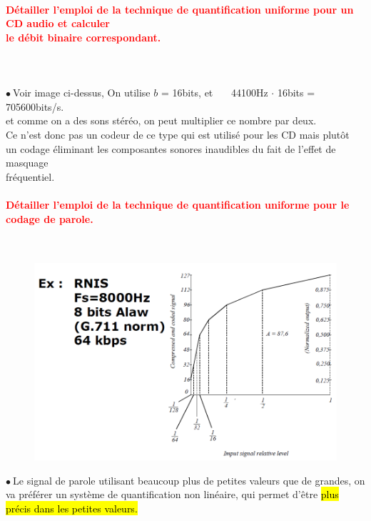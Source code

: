 \documentclass[letterpaper, 12pt]{article}
\newcommand{\alinea}{
\hspace*{0.3cm}}
\newcommand{\red}[1]{
	\textcolor{red}{#1}
}
\newcommand{\point}{$\bullet\ $}
\begin{document}
		\paragraph{\red{Détailler l'emploi de la technique de quantification uniforme pour un CD audio et calculer  
		~\\ \hspace*{0.035cm} le débit binaire correspondant.}}~\\~\\
			\point Voir image ci-dessus, On utilise $b$ = 16bits, et \ \ \ 44100Hz $\cdot$ 16bits = 705600bits/s.
				\\\alinea et comme on a des sons stéréo, on peut multiplier ce nombre par deux.
				\\\alinea Ce n'est donc pas un codeur de ce type qui est utilisé pour les CD mais plutôt
				\\\alinea un codage éliminant les composantes sonores inaudibles du fait de l'effet de masquage 
				\\\alinea fréquentiel.
		
		\paragraph{\red{Détailler l'emploi de la technique de quantification uniforme pour le codage de parole.}}
		~\\
			\begin{minipage}{0.6\textwidth}
				\begin{figure}[H]
					\centering
					\includegraphics[scale=0.5]{Images/nuquantization}
				\end{figure}\noindent
			\end{minipage}\hfill
			\begin{minipage}{0.35\textwidth}
				\point Le signal de parole utilisant beaucoup plus de petites valeurs que de grandes, 
					on va préférer un système de quantification non linéaire, qui permet d'être \hl{plus pr\'ecis dans
					les petites valeurs.}
			\end{minipage}
		
\end{document}
